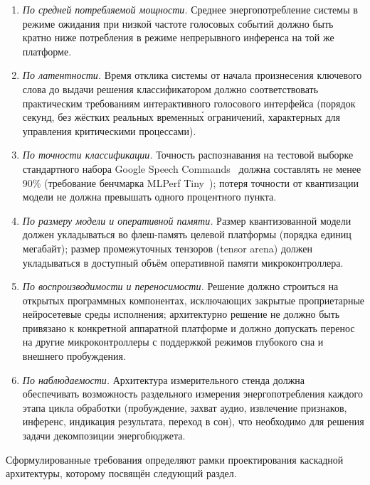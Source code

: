 \begin{enumerate}
	\item \textit{По средней потребляемой мощности.} Среднее
	      энергопотребление системы в режиме ожидания при низкой частоте
	      голосовых событий должно быть кратно ниже потребления в режиме
	      непрерывного инференса на той же платформе.
	\item \textit{По латентности.} Время отклика системы от начала
	      произнесения ключевого слова до выдачи решения классификатором
	      должно соответствовать практическим требованиям интерактивного
	      голосового интерфейса (порядок секунд, без жёстких реальных
	      временны\'{х} ограничений, характерных для управления критическими
	      процессами).
	\item \textit{По точности классификации.} Точность распознавания на
	      тестовой выборке стандартного набора Google Speech
	      Commands~\cite{src:2} должна составлять не менее 90\%
	      (требование бенчмарка MLPerf Tiny~\cite{src:5}); потеря точности
	      от квантизации модели не должна превышать одного процентного
	      пункта.
	\item \textit{По размеру модели и оперативной памяти.} Размер
	      квантизованной модели должен укладываться во флеш-память
	      целевой платформы (порядка единиц мегабайт); размер
	      промежуточных тензоров (tensor arena) должен укладываться в
	      доступный объём оперативной памяти микроконтроллера.
	\item \textit{По воспроизводимости и переносимости.} Решение должно
	      строиться на открытых программных компонентах, исключающих
	      закрытые проприетарные нейросетевые среды исполнения;
	      архитектурно решение не должно быть привязано к конкретной
	      аппаратной платформе и должно допускать перенос на другие
	      микроконтроллеры с поддержкой режимов глубокого сна и внешнего
	      пробуждения.
	\item \textit{По наблюдаемости.} Архитектура измерительного стенда
	      должна обеспечивать возможность раздельного измерения
	      энергопотребления каждого этапа цикла обработки (пробуждение,
	      захват аудио, извлечение признаков, инференс, индикация
	      результата, переход в сон), что необходимо для решения задачи
	      декомпозиции энергобюджета.
\end{enumerate}

Сформулированные требования определяют рамки проектирования каскадной
архитектуры, которому посвящён следующий раздел.
